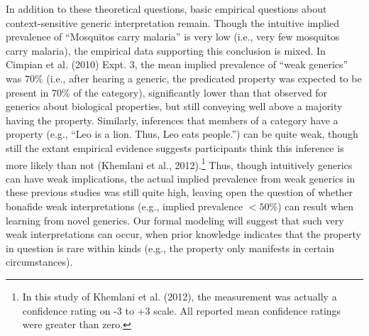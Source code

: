 \documentclass[floatsintext,doc]{apa6}
\let\rmarkdownfootnote\footnote%
\def\footnote{\protect\rmarkdownfootnote}
\begin{document}
In addition to these theoretical questions, basic empirical questions about context-sensitive generic interpretation remain.
Though the intuitive implied prevalence of \enquote{Mosquitos carry malaria} is very low (i.e., very few mosquitos carry malaria), the empirical data supporting this conclusion is mixed.
In Cimpian et al. (2010) Expt. 3, the mean implied prevalence of \enquote{weak generics} was \(70\%\) (i.e., after hearing a generic, the predicated property was expected to be present in 70\% of the category), significantly lower than that observed for generics about biological properties, but still conveying well above a majority having the property.
Similarly, inferences that members of a category have a property (e.g., \enquote{Leo is a lion. Thus, Leo eats people.}) can be quite weak, though still the extant empirical evidence suggests participants think this inference is more likely than not (Khemlani et al., 2012).\footnote{In this study of Khemlani et al. (2012), the measurement was actually a confidence rating on -3 to +3 scale. All reported mean confidence ratings were greater than zero. }
Thus, though intuitively generics can have weak implications, the actual implied prevalence from weak generics in these previous studies was still quite high, leaving open the question of whether bonafide weak interpretations (e.g., implied prevalence \(<50\%\)) can result when learning from novel generics.
Our formal modeling will suggest that such very weak interpretations can occur, when prior knowledge indicates that the property in question is rare within kinds (e.g., the property only manifests in certain circumstances).
\end{document}
